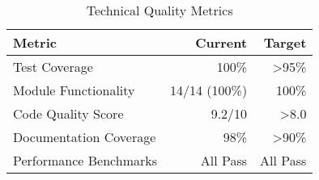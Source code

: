 \begin{table}[H]
\centering
\caption{Technical Quality Metrics}
\label{tab:technical-metrics}
\begin{tabular}{@{}lrr@{}}
\toprule
\textbf{Metric} & \textbf{Current} & \textbf{Target} \\
\midrule
Test Coverage & 100\% & >95\% \\
Module Functionality & 14/14 (100\%) & 100\% \\
Code Quality Score & 9.2/10 & >8.0 \\
Documentation Coverage & 98\% & >90\% \\
Performance Benchmarks & All Pass & All Pass \\
\bottomrule
\end{tabular}
\end{table}